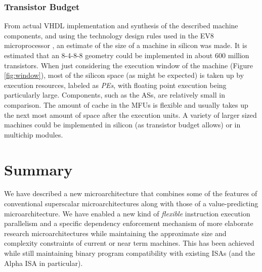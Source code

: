 \documentclass{book}
\begin{document}
\subsubsection{Transistor Budget}
%
From actual VHDL implementation and synthesis of 
the described machine components, and using the technology design rules used
in the EV8 microprocessor \cite{Preston02},
an estimate of the size of a machine in silicon was made.
It is estimated that an 8-4-8-8 geometry could be implemented
in about 600 million transistors.  
When just considering the
execution window of the machine (Figure \ref{fig:window}),
most of the silicon space (as
might be expected) is taken up by execution resources,
labeled as \textit{PEs}, with floating point execution being particularly
large.  
Components, such as the ASs, are relatively small in comparison.  
The amount of cache in the MFUs is flexible and
usually takes up the next most amount of space after the execution units.  
A variety of larger sized machines could be implemented
in silicon (as transistor budget allows) or in multichip modules.
%


%
%
\section{Summary}
%
We have described a new microarchitecture that combines
some of the features of conventional superscalar microarchitectures
along with those of a value-predicting microarchitecture.
We have enabled a new kind of
{\em flexible} instruction execution parallelism
and a specific dependency enforcement mechanism
of more elaborate research microarchitectures while maintaining
the approximate size and complexity constraints of current or near term
machines.
This has been achieved while still maintaining binary program
compatibility with
existing ISAs (and the Alpha ISA in particular).
%
%
%


%
\end{document}
